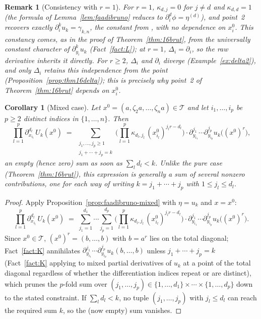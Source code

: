 \documentclass[10pt,a4paper]{amsart}
\newtheorem{corollary}[theorem]{Corollary}
\newtheorem{remark}[theorem]{Remark}
\begin{document}
\begin{remark}[Consistency with $r=1$]
For $r=1$, $\kappa_{d,j}=0$ for $j\ne d$ and $\kappa_{d,d}=1$ (the formula of Lemma~\ref{lem:faadibruno} reduces to $\partial_i^d\phi=\eta^{(d)}$), and point~2 recovers exactly $\partial_i^ku_k=\gamma_{k,n}$, the constant from \cite[Theorem~21]{Ze}, with no dependence on $x_i^0$. This constancy comes, as in the proof of Theorem~\ref{thm:16brut}, from the universally constant character of $\partial_{y_i}^ku_k$ (Fact~\ref{fact:L}); at $r=1$, $\Delta_i=\partial_i$, so the \emph{raw} derivative inherits it directly. For $r\ge2$, $\Delta_i$ and $\partial_i$ diverge (Example~\ref{ex:delta2}), and only $\Delta_i$ retains this independence from the point (Proposition~\ref{prop:thm16delta}); this is precisely why point~2 of Theorem~\ref{thm:16brut} depends on $x_i^0$.
\end{remark}

\begin{corollary}[Mixed case]\label{cor:mixed-U_k}
Let $x^0=(a,\zeta_2a,\dots,\zeta_na)\in\mathcal T$ and let $i_1,\dots,i_p$ be $p\ge2$ distinct indices in $\{1,\dots,n\}$. Then
\[
\prod_{l=1}^p \partial_{x_{i_l}}^{d_l}\, U_k(x^0) \;=\; \sum_{\substack{j_1,\dots,j_p\ge1 \\ j_1+\cdots+j_p=k}} \Big(\prod_{l=1}^p \kappa_{d_l,j_l}\,(x_{i_l}^0)^{j_lr-d_l}\Big)\cdot \partial_{y_{i_1}}^{j_1}\cdots\partial_{y_{i_p}}^{j_p}u_k\big((x^0)^r\big),
\]
an empty (hence zero) sum as soon as $\sum_l d_l<k$. Unlike the pure case (Theorem~\ref{thm:16brut}), this expression is generally a sum of several nonzero contributions, one for each way of writing $k=j_1+\cdots+j_p$ with $1\le j_l\le d_l$.
\end{corollary}

\begin{proof}
Apply Proposition~\ref{prop:faadibruno-mixed} with $\eta=u_k$ and $x=x^0$:
\[
\prod_{l=1}^p \partial_{x_{i_l}}^{d_l}\, U_k(x^0) \;=\; \sum_{j_1=1}^{d_1}\cdots\sum_{j_p=1}^{d_p} \Big(\prod_{l=1}^p \kappa_{d_l,j_l}\,(x_{i_l}^0)^{j_lr-d_l}\Big)\cdot \partial_{y_{i_1}}^{j_1}\cdots\partial_{y_{i_p}}^{j_p}u_k\big((x^0)^r\big).
\]
Since $x^0\in\mathcal T$, $(x^0)^r=(b,\dots,b)$ with $b=a^r$ lies on the total diagonal; Fact~\ref{fact:K} annihilates $\partial_{y_{i_1}}^{j_1}\cdots\partial_{y_{i_p}}^{j_p}u_k(b,\dots,b)$ unless $j_1+\cdots+j_p=k$ (Fact~\ref{fact:K} applying to mixed partial derivatives of $u_k$ at a point of the total diagonal regardless of whether the differentiation indices repeat or are distinct), which prunes the $p$-fold sum over $(j_1,\dots,j_p)\in\{1,\dots,d_1\}\times\cdots\times\{1,\dots,d_p\}$ down to the stated constraint. If $\sum_l d_l<k$, no tuple $(j_1,\dots,j_p)$ with $j_l\le d_l$ can reach the required sum $k$, so the (now empty) sum vanishes.
\end{proof}
\end{document}

